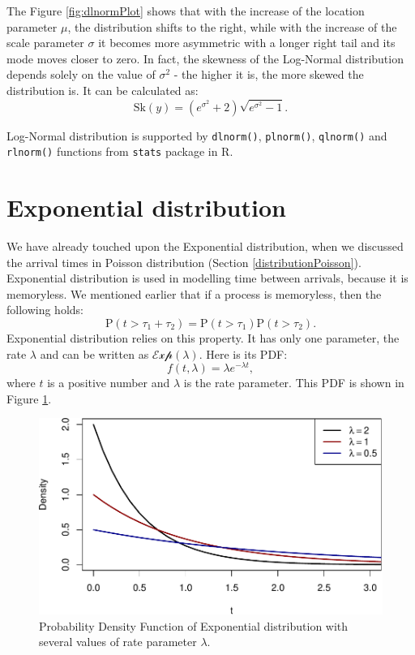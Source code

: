 \documentclass[
]{book}
\theoremstyle{definition}
\theoremstyle{definition}
\theoremstyle{definition}
\theoremstyle{definition}
\theoremstyle{remark}
\begin{document}
The Figure \ref{fig:dlnormPlot} shows that with the increase of the location parameter \(\mu\), the distribution shifts to the right, while with the increase of the scale parameter \(\sigma\) it becomes more asymmetric with a longer right tail and its mode moves closer to zero. In fact, the skewness of the Log-Normal distribution depends solely on the value of \(\sigma^2\) - the higher it is, the more skewed the distribution is. It can be calculated as:
\begin{equation}
    \mathrm{Sk}(y) = \left(e^{\sigma^2} + 2\right) \sqrt{e^{\sigma^2}-1} .
    \label{eq:LogNormalSkewness}
\end{equation}

Log-Normal distribution is supported by \texttt{dlnorm()}, \texttt{plnorm()}, \texttt{qlnorm()} and \texttt{rlnorm()} functions from \texttt{stats} package in R.

\section{Exponential distribution}\label{distributionsExponential}

We have already touched upon the Exponential distribution, when we discussed the arrival times in Poisson distribution (Section \ref{distributionPoisson}). Exponential distribution is used in modelling time between arrivals, because it is memoryless. We mentioned earlier that if a process is memoryless, then the following holds:
\begin{equation*}
    \mathrm{P}(t > \tau_1 + \tau_2) = \mathrm{P}(t > \tau_1)\mathrm{P}(t > \tau_2) .
\end{equation*}
Exponential distribution relies on this property. It has only one parameter, the rate \(\lambda\) and can be written as \(\mathcal{Exp}(\lambda)\). Here is its PDF:
\begin{equation}
    f(t, \lambda) = \lambda e^{-\lambda t} ,
    \label{eq:ExponentialPMF}
\end{equation}
where \(t\) is a positive number and \(\lambda\) is the rate parameter. This PDF is shown in Figure \ref{fig:dexpPlot}.

\begin{figure}
\centering
\includegraphics{Svetunkov---Statistics-for-Business-Analytics_files/figure-latex/dexpPlot-1.pdf}
\caption{\label{fig:dexpPlot}Probability Density Function of Exponential distribution with several values of rate parameter \(\lambda\).}
\end{figure}
\end{document}

